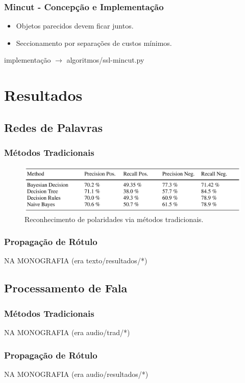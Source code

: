 \documentclass{beamer}
\begin{document}
      \frame
      {
        \frametitle{Mincut - Concepção e Implementação}
        \begin{itemize}
          \item Objetos parecidos devem ficar juntos.
          \item Seccionamento por separações de custos mínimos.
        \end{itemize}

        \begin{center}
implementação $\rightarrow$ algoritmos/ssl-mincut.py
        \end{center}
      }

  \section{Resultados}
    \frame{\tableofcontents[current]}
    \subsection{Redes de Palavras}
      \frame
      {
        \frametitle{Métodos Tradicionais}
      \begin{figure}[!h]
        \begin{center}
                \includegraphics[width=.7\textwidth]{palavras-diego}
        \end{center}
        \caption{Reconhecimento de polaridades via métodos tradicionais.}
      \end{figure}
      }
      \frame
      {
        \frametitle{Propagação de Rótulo}
        \begin{center}
            NA MONOGRAFIA (era texto/resultados/*)
        \end{center}
      }
    \subsection{Processamento de Fala}
      \frame
      {
        \frametitle{Métodos Tradicionais}
        \begin{center}
            NA MONOGRAFIA (era audio/trad/*)
        \end{center}
      }
      \frame
      {
        \frametitle{Propagação de Rótulo}
        \begin{center}
            NA MONOGRAFIA (era audio/resultados/*)
        \end{center}
      }
\end{document}
